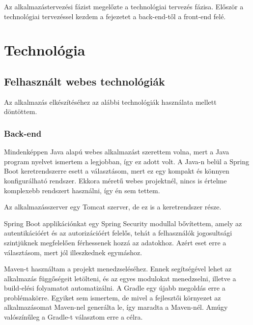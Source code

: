 




Az alkalmazástervezési fázist megelőzte a technológiai tervezés fázisa. Először a technológiai tervezéssel kezdem a fejezetet a back-end-től a front-end felé.

\section{Technológia}

\subsection{Felhasznált webes technológiák}

Az alkalmazás elkészítéséhez az alábbi technológiák használata mellett döntöttem.

\subsubsection{Back-end}
Mindenképpen Java alapú webes alkalmazást szerettem volna, mert a Java program nyelvet ismertem a legjobban, így ez adott volt. A Java-n belül a Spring Boot keretrendszerre esett a választásom, mert ez egy kompakt és könnyen konfigurálható rendszer. Ekkora méretű webes projektnél, nincs is értelme komplexebb rendszert használni, így én sem tettem. 

Az alkalmazásszerver egy Tomcat szerver, de ez is a keretrendszer része. 

Spring Boot applikációnkat egy Spring Security modullal bővítettem, amely az autentikációért és az autorizációért felelős, tehát  a felhasználók jogosultsági szintjüknek megfelelően férhessenek hozzá az adatokhoz. Azért eset erre a választásom, mert jól illeszkednek egymáshoz.

Maven-t használtam a projekt menedzseléséhez. Ennek segítségével lehet az alkalmazás függőségeit letölteni, és az egyes modulokat menedzselni, illetve a build-elési folyamatot automatizálni. A Gradle egy újabb megoldás erre a problémakörre. Egyiket sem ismertem, de mivel a fejlesztői környezet az alkalmazásomat Maven-nel generálta le, így maradta a Maven-nél. Amúgy valószínűleg a Gradle-t választom erre a célra.

